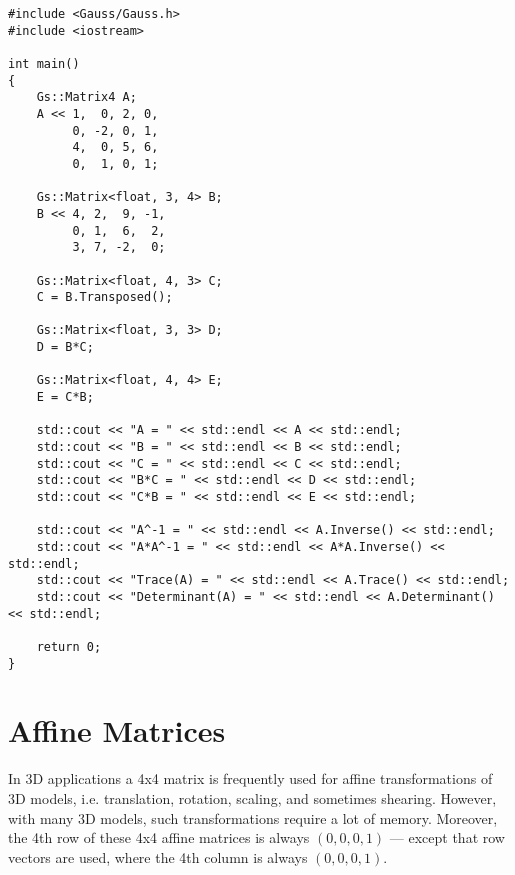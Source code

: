 \documentclass{article}
\begin{document}
\begin{lstlisting}
#include <Gauss/Gauss.h>
#include <iostream>

int main()
{
	Gs::Matrix4 A;
	A << 1,  0, 2, 0,
	     0, -2, 0, 1,
	     4,  0, 5, 6,
	     0,  1, 0, 1;
	
	Gs::Matrix<float, 3, 4> B;
	B << 4, 2,  9, -1,
	     0, 1,  6,  2,
	     3, 7, -2,  0;
	
	Gs::Matrix<float, 4, 3> C;
	C = B.Transposed();
	
	Gs::Matrix<float, 3, 3> D;
	D = B*C;
	
	Gs::Matrix<float, 4, 4> E;
	E = C*B;
	
	std::cout << "A = " << std::endl << A << std::endl;
	std::cout << "B = " << std::endl << B << std::endl;
	std::cout << "C = " << std::endl << C << std::endl;
	std::cout << "B*C = " << std::endl << D << std::endl;
	std::cout << "C*B = " << std::endl << E << std::endl;
	
	std::cout << "A^-1 = " << std::endl << A.Inverse() << std::endl;
	std::cout << "A*A^-1 = " << std::endl << A*A.Inverse() << std::endl;
	std::cout << "Trace(A) = " << std::endl << A.Trace() << std::endl;
	std::cout << "Determinant(A) = " << std::endl << A.Determinant() << std::endl;

	return 0;
}
\end{lstlisting}



\newpage

\section*{Affine Matrices}
\label{sec:affine_matrices}

In 3D applications a 4x4 matrix is frequently used for affine transformations of 3D models,
i.e. translation, rotation, scaling, and sometimes shearing.
However, with many 3D models, such transformations require a lot of memory.
Moreover, the 4th row of these 4x4 affine matrices is always $(0, 0, 0, 1)$ --- except that row vectors are used,
where the 4th column is always $(0, 0, 0, 1)$.
\end{document}
